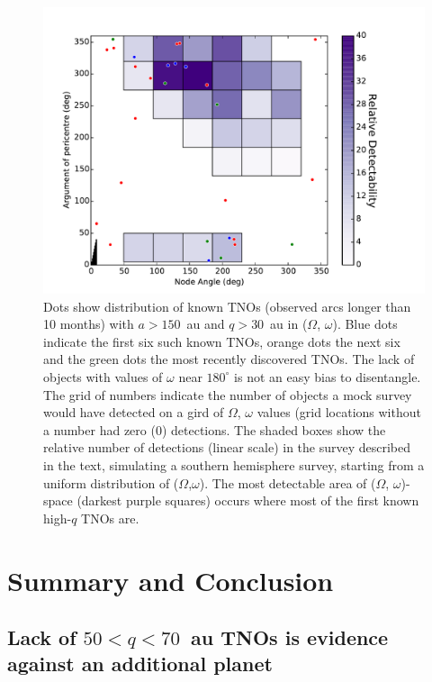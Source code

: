 \documentclass{aastex62}
\begin{document}
\begin{figure}
\centering
\includegraphics[width=\textwidth]{figure2.pdf}
\caption{Dots show distribution of known TNOs (observed arcs longer than 10 months) with $a > 150$~au and $q > 30$~au in ($\Omega$, $\omega$).  Blue dots indicate the first six such known TNOs, orange dots the next six and the green dots the most recently discovered TNOs.  The lack of objects with values of $\omega$ near $180^{\circ}$ is not an easy bias to disentangle.  The grid of numbers indicate the number of objects a mock survey would have detected on a gird of $\Omega$, $\omega$ values (grid locations without a number had zero (0) detections.  
The shaded boxes show the relative number of detections (linear scale) in the survey described in the text, simulating a southern hemisphere survey, starting from a uniform distribution of ($\Omega$,$\omega$).
The most detectable area of ($\Omega$, $\omega$)-space (darkest purple squares) occurs where most of the first known high-$q$ TNOs are. }
\label{fig:bias_jj}
\end{figure}




\section{Summary and Conclusion} 

\subsection{Lack of $50<q<70$~au TNOs is evidence against an additional planet}
\end{document}
